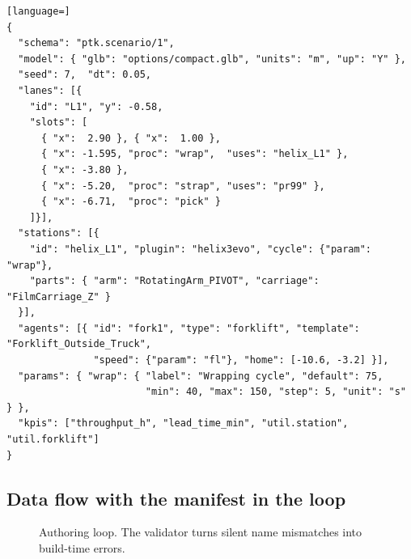\documentclass[11pt,a4paper]{article}
\begin{document}
\begin{lstlisting}[language=]
{
  "schema": "ptk.scenario/1",
  "model": { "glb": "options/compact.glb", "units": "m", "up": "Y" },
  "seed": 7,  "dt": 0.05,
  "lanes": [{
    "id": "L1", "y": -0.58,
    "slots": [
      { "x":  2.90 }, { "x":  1.00 },
      { "x": -1.595, "proc": "wrap",  "uses": "helix_L1" },
      { "x": -3.80 },
      { "x": -5.20,  "proc": "strap", "uses": "pr99" },
      { "x": -6.71,  "proc": "pick" }
    ]}],
  "stations": [{
    "id": "helix_L1", "plugin": "helix3evo", "cycle": {"param": "wrap"},
    "parts": { "arm": "RotatingArm_PIVOT", "carriage": "FilmCarriage_Z" }
  }],
  "agents": [{ "id": "fork1", "type": "forklift", "template": "Forklift_Outside_Truck",
               "speed": {"param": "fl"}, "home": [-10.6, -3.2] }],
  "params": { "wrap": { "label": "Wrapping cycle", "default": 75,
                        "min": 40, "max": 150, "step": 5, "unit": "s" } },
  "kpis": ["throughput_h", "lead_time_min", "util.station", "util.forklift"]
}
\end{lstlisting}

\subsection{Data flow with the manifest in the loop}

\begin{figure}[H]
\centering
{}
\caption{Authoring loop. The validator turns silent name mismatches into build-time errors.}
\label{fig:loop}
\end{figure}
\end{document}

